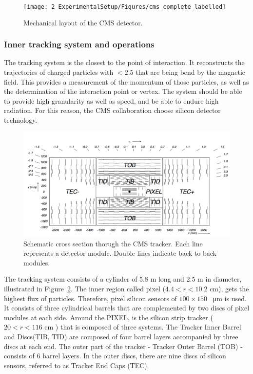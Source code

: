 \begin{figure}[ht]
   \centering
	\texttt{[image: 2\_ExperimentalSetup/Figures/cms\_complete\_labelled]}
	\caption{Mechanical layout of the CMS detector\cite{CMSdraw}.}
	\label{fig:CMS}
\end{figure}
	

\subsubsection{Inner tracking system and operations}
The tracking system is the closest to the point of interaction. It reconstructs the trajectories of charged particles with \abspsrap $<2.5$ that are being bend by the magnetic field. This provides a measurement of the momentum of those particles, as well as the determination of the interaction point or vertex. The system should be able to provide high granularity as well as speed, and be able to endure high radiation. For this reason, the CMS collaboration choose silicon detector technology.

\begin{figure}[ht]
	\centering
	\includegraphics[width=\textwidth]{2_ExperimentalSetup/Figures/imageedit_3_5170744545}
	\caption{Schematic cross section thorugh the CMS tracker. Each line represents a detector module. Double lines indicate back-to-back modules\cite{Chatrchyan:2008aa}.}
	\label{fig:Tracker}
\end{figure}

 The tracking system consists of a cylinder of 5.8 \si{ \meter} long and 2.5 \si{ \meter} in diameter,  illustrated in Figure~\ref{fig:Tracker}. 
 The inner region called pixel ($4.4<r<10.2$ \si{ \cm}), gets the highest flux of particles. Therefore, pixel silicon sensors of $100 \times 150$ \si{ \squared \micro \meter} is used. It consists of three cylindrical barrels that are complemented by two discs of pixel modules at each side.
  Around the PIXEL, is the silicon strip tracker ($20<r<116$ \si{ \cm} ) that is composed of three systems. The Tracker Inner Barrel  and Discs(TIB, TID) are composed of four barrel layers accompanied by three discs at each end. The outer part of the tracker - Tracker Outer Barrel (TOB) -  consists  of 6 barrel layers. In the outer discs, there are nine discs of silicon sensors, referred to as Tracker End Caps (TEC). 
 



